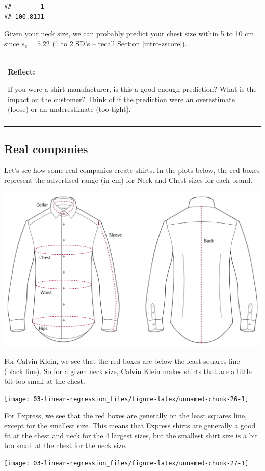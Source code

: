 \documentclass[
]{book}
\newenvironment{reflect}
{
    \begin{center}
    
    \begin{tabular}{|p{0.8\textwidth}|}
    \rowcolor{LightBlue}
    \hline\\
    \rowcolor{LightBlue}
    \textbf{Reflect:}
}
{
    \\\rowcolor{LightBlue}
    \\\hline
    \end{tabular} 
    \end{center}
}
\begin{document}
\begin{verbatim}
##        1 
## 100.8131
\end{verbatim}

Given your neck size, we can probably predict your chest size within 5 to 10 cm since \(s_e = 5.22\) (1 to 2 SD's -- recall Section \ref{intro-zscore}).

\begin{reflect}
If you were a shirt manufacturer, is this a good enough prediction? What
is the impact on the customer? Think of if the prediction were an
overestimate (loose) or an underestimate (too tight).
\end{reflect}

\hypertarget{real-companies}{%
\subsection{Real companies}\label{real-companies}}

Let's see how some real companies create shirts. In the plots below, the red boxes represent the advertised range (in cm) for Neck and Chest sizes for each brand.

\begin{center}\includegraphics[width=.25\textwidth]{Photos/shirtchart} \end{center}

For Calvin Klein, we see that the red boxes are below the least squares line (black line). So for a given neck size, Calvin Klein makes shirts that are a little bit too small at the chest.

\begin{center}\texttt{[image: 03-linear-regression\_files/figure-latex/unnamed-chunk-26-1]} \end{center}

For Express, we see that the red boxes are generally on the least squares line, except for the smallest size. This means that Express shirts are generally a good fit at the chest and neck for the 4 largest sizes, but the smallest shirt size is a bit too small at the chest for the neck size.

\begin{center}\texttt{[image: 03-linear-regression\_files/figure-latex/unnamed-chunk-27-1]} \end{center}
\end{document}
